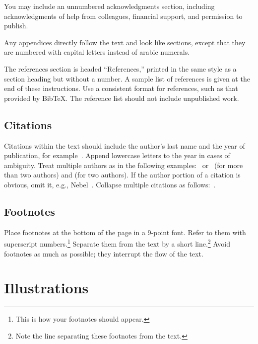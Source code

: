 \documentclass{article}
\theoremstyle{definition}
\begin{document}
You may include an unnumbered acknowledgments section, including
acknowledgments of help from colleagues, financial support, and
permission to publish.

Any appendices directly follow the text and look like sections, except
that they are numbered with capital letters instead of arabic
numerals.

The references section is headed ``References,'' printed in the same
style as a section heading but without a number. A sample list of
references is given at the end of these instructions. Use a consistent
format for references, such as that provided by Bib\TeX{}. The reference
list should not include unpublished work.

\subsection{Citations}

Citations within the text should include the author's last name and
the year of publication, for example~\cite{gottlob:nonmon}.  Append
lowercase letters to the year in cases of ambiguity.  Treat multiple
authors as in the following examples:~\cite{abelson-et-al:scheme}
or~\cite{bgf:Lixto} (for more than two authors) and
\cite{brachman-schmolze:kl-one} (for two authors).  If the author
portion of a citation is obvious, omit it, e.g.,
Nebel~.  Collapse multiple citations as
follows:~\cite{gls:hypertrees,levesque:functional-foundations}.
\nocite{abelson-et-al:scheme}
\nocite{bgf:Lixto}
\nocite{brachman-schmolze:kl-one}
\nocite{gottlob:nonmon}
\nocite{gls:hypertrees}
\nocite{levesque:functional-foundations}
\nocite{levesque:belief}
\nocite{nebel:jair-2000}

\subsection{Footnotes}

Place footnotes at the bottom of the page in a 9-point font.  Refer to
them with superscript numbers.\footnote{This is how your footnotes
should appear.} Separate them from the text by a short
line.\footnote{Note the line separating these footnotes from the
text.} Avoid footnotes as much as possible; they interrupt the flow of
the text.

\section{Illustrations}
\end{document}
